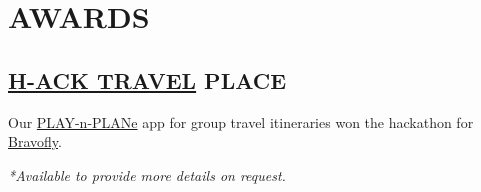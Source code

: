 \documentclass[]{deedy-resume-cv}
\begin{document}
\begin{minipage}[t]{0.35\textwidth}
\section{AWARDS}

\subsection{\href{https://www.h-farm.com/it/nostri-eventi-hack}{H-ACK TRAVEL}  PLACE}
Our \href{https://drive.google.com/file/d/0B2vKVAUdRszZblFaNTQ2SnRiV3c/}{PLAY-n-PLANe} app for group travel itineraries won the hackathon for \href{https://www.bravofly.com/}{Bravofly}.

\vspace{3pt}
\small{\textit{*Available to provide more details on request.}}

\end{minipage}

%
%
\privacy
\end{document}
